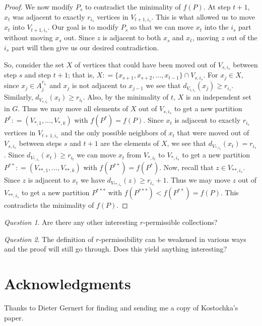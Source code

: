 \documentclass[12pt]{article}
\theoremstyle{plain}
\theoremstyle{definition}
\theoremstyle{remark}
\newtheorem*{question}{Question}
\newcommand{\DefinedAs}{\mathrel{\mathop:}=}
\begin{document}
\begin{proof}
We now modify $P_s$ to contradict the minimality of $f(P)$.  At step $t+1$,  $x_t$ was adjacent to exactly $r_{i_s}$ vertices in $V_{t+1, i_s}$. This is what allowed us to move $x_t$ into $V_{t+1, i_s}$.  Our goal is to modify $P_s$ so that we can move $x_t$ into the $i_s$ part without moving $x_s$ out. Since $z$ is adjacent to both $x_s$ and $x_t$, moving $z$ out of the $i_s$ part will then give us our desired contradiction.  

So, consider the set $X$ of vertices that could have been moved out of $V_{s, i_s}$ between step $s$ and step $t+1$; that is, $X \DefinedAs \{x_{s+1}, x_{s+2}, \ldots, x_{t-1}\} \cap V_{s, i_s}$.  For $x_j \in X$, since $x_j \in A_j^{r_{i_s}}$ and $x_j$ is not adjacent to $x_{j-1}$ we see that $d_{V_{s, i_s}}(x_j) \geq r_{i_s}$.  Similarly, $d_{V_{s, i_t}}(x_t) \geq r_{i_t}$. Also, by the minimality of $t$, $X$ is an independent set in $G$.  Thus we may move all elements of $X$ out of $V_{s, i_s}$ to get a new partition $P^* \DefinedAs (V_{*, 1}, \ldots, V_{*, k})$ with $f(P^*) = f(P)$.  Since $x_t$ is adjacent to exactly $r_{i_s}$ vertices in $V_{t+1, i_s}$ and the only possible neighbors of $x_t$ that were moved out of $V_{s, i_s}$ between steps $s$ and $t+1$ are the elements of $X$, we see that $d_{V_{*, i_s}}(x_t) = r_{i_s}$.  Since $d_{V_{*, i_t}}(x_t) \geq r_{i_t}$ we can move $x_t$ from $V_{*, i_t}$ to $V_{*, i_s}$ to get a new partition $P^{**} \DefinedAs (V_{**, 1}, \ldots, V_{**, k})$ with $f(P^{**}) = f(P^*)$.  Now, recall that $z \in V_{**, i_s}$.  Since $z$ is adjacent to $x_t$ we have $d_{V_{**, i_s}}(z) \geq r_{i_s} + 1$.  Thus we may move $z$ out of $V_{**, i_s}$ to get a new partition $P^{***}$ with $f(P^{***}) < f(P^{**}) = f(P)$.  This contradicts the minimality of $f(P)$.
\end{proof}

\begin{question}
Are there any other interesting $r$-permissible collections?
\end{question}

\begin{question}
The definition of $r$-permissibility can be weakened in various ways and the proof will still go through.  Does this yield anything interesting?
\end{question}

\section*{Acknowledgments}
Thanks to Dieter Gernert for finding and sending me a copy of Kostochka's paper.
\end{document}
